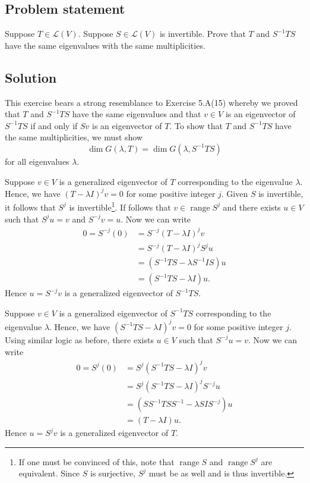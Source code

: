 \documentclass{article}
\begin{document}
\subsection*{Problem statement}
Suppose $T\in\mathcal{L}(V)$. 
Suppose $S\in\mathcal{L}(V)$ is invertible. 
Prove that $T$ and $S^{-1}TS$ have the same eigenvalues with the same multiplicities.

\subsection*{Solution}
This exercise bears a strong resemblance to Exercise 5.A(15) whereby we proved that $T$ and $S^{-1}TS$ have the same eigenvalues and that $v\in V$ is an eigenvector of $S^{-1}TS$ if and only if $Sv$ is an eigenvector of $T$. 
To show that $T$ and $S^{-1}TS$ have the same multiplicities, we must show 
\[\operatorname{dim}G(\lambda,T)=\operatorname{dim}G(\lambda,S^{-1}TS)\]
for all eigenvalues $\lambda$.

Suppose $v\in V$ is a generalized eigenvector of $T$ corresponding to the eigenvalue $\lambda$. 
Hence, we have $(T-\lambda I)^jv=0$ for some positive integer $j$. 
Given $S$ is invertible, it follows that $S^{j}$ is invertible\footnote{
If one must be convinced of this, note that $\operatorname{range}S$ and $\operatorname{range}S^j$ are equivalent. Since $S$ is surjective, $S^j$ must be as well and is thus invertible.
}. 
If follows that $v\in\operatorname{range}S^j$ and there exists $u\in V$ such that $S^ju=v$ and $S^{-j}v=u$. 
Now we can write
\begin{align*}
    0=S^{-j}(0)&=S^{-j}(T-\lambda I)^jv\\
    &=S^{-j}(T-\lambda I)^jS^ju\\
    &=(S^{-1}TS-\lambda S^{-1}IS)u\\
    &=(S^{-1}TS-\lambda I)u.
\end{align*}
Hence $u=S^{-j}v$ is a generalized eigenvector of $S^{-1}TS$.

Suppose $v\in V$ is a generalized eigenvector of $S^{-1}TS$ corresponding to the eigenvalue $\lambda$. 
Hence, we have $(S^{-1}TS-\lambda I)^jv=0$ for some positive integer $j$. 
Using similar logic as before, there exists $u\in V$ such that $S^{-j}u=v$. 
Now we can write
\begin{align*}
    0=S^{j}(0)&=S^{j}(S^{-1}TS-\lambda I)^jv\\
    &=S^{j}(S^{-1}TS-\lambda I)^jS^{-j}u\\
    &=(SS^{-1}TSS^{-1}-\lambda SIS^{-j})u\\
    &=(T-\lambda I)u.
\end{align*}
Hence $u=S^{j}v$ is a generalized eigenvector of $T$.
\end{document}
